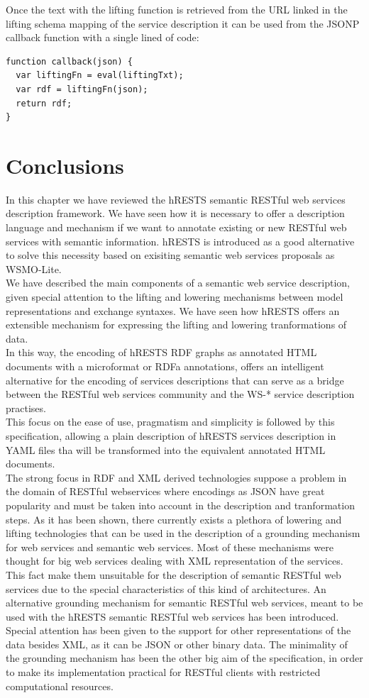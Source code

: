 Once the text with the lifting function is retrieved from the URL linked in the lifting schema mapping of the service description it can be used from the JSONP callback function with a single lined of code:
\vspace{5 mm}
\begin{lstlisting}
function callback(json) {
  var liftingFn = eval(liftingTxt);
  var rdf = liftingFn(json);
  return rdf;
}
\end{lstlisting}
\vspace{5 mm}

\section{Conclusions}
In this chapter  we have reviewed the hRESTS semantic RESTful web services description framework. We have seen how it is necessary to offer a description language and mechanism if we want to annotate existing or new RESTful web services with semantic information. hRESTS is introduced as a good alternative to solve this necessity based on exisiting semantic web services proposals as WSMO-Lite.\\
We have described the main components of a semantic web service description, given special attention to the lifting and lowering mechanisms between model representations and exchange syntaxes. We have seen how hRESTS offers an extensible mechanism for expressing the lifting and lowering tranformations of data.\\
In this way, the encoding of hRESTS RDF graphs as annotated HTML documents with a microformat or RDFa annotations, offers an intelligent alternative for the encoding of services descriptions that can serve as a bridge between the RESTful web services community and the WS-* service description practises.\\
This focus on the ease of use, pragmatism and simplicity is followed by this specification, allowing a plain description of hRESTS services description in YAML files tha will be transformed into the equivalent annotated HTML documents.\\
The strong focus in RDF and XML derived technologies suppose a problem in the domain of RESTful webservices where encodings as JSON have great popularity and must be taken into account in the description and tranformation steps. As it has been shown, there currently exists a plethora of lowering and lifting technologies that can be used in the description of a grounding mechanism for web services and semantic web services. Most of these mechanisms were thought for big web services dealing with XML representation of the services. This fact make them unsuitable for the description of semantic RESTful web services due to the special characteristics of this kind of architectures. An alternative grounding mechanism for semantic RESTful web services, meant to be used with the hRESTS semantic RESTful web services has been introduced. Special attention has been given to the support for other representations of the data besides XML, as it can be JSON or other binary data. The minimality of the grounding mechanism has been the other big aim of the specification, in order to make its implementation practical for RESTful clients with restricted computational resources.\\